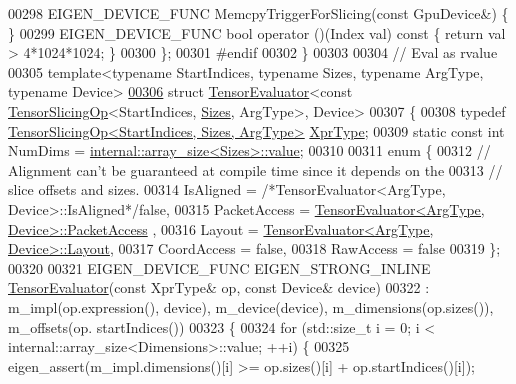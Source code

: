 \begin{DoxyCode}
00298   EIGEN\_DEVICE\_FUNC MemcpyTriggerForSlicing(\textcolor{keyword}{const} GpuDevice&) \{ \}
00299   EIGEN\_DEVICE\_FUNC \textcolor{keywordtype}{bool} operator ()(Index val)\textcolor{keyword}{ const }\{ \textcolor{keywordflow}{return} val > 4*1024*1024; \}
00300 \};
00301 \textcolor{preprocessor}{#endif}
00302 \}
00303 
00304 \textcolor{comment}{// Eval as rvalue}
00305 \textcolor{keyword}{template}<\textcolor{keyword}{typename} StartIndices, \textcolor{keyword}{typename} Sizes, \textcolor{keyword}{typename} ArgType, \textcolor{keyword}{typename} Device>
\hyperlink{struct_eigen_1_1_tensor_evaluator_3_01const_01_tensor_slicing_op_3_01_start_indices_00_01_sizes_ad061dd92ee73f8ad7fd3bb05ad7286d}{00306} \textcolor{keyword}{struct }\hyperlink{struct_eigen_1_1_tensor_evaluator}{TensorEvaluator}<const \hyperlink{class_eigen_1_1_tensor_slicing_op}{TensorSlicingOp}<StartIndices, 
      \hyperlink{struct_eigen_1_1_sizes}{Sizes}, ArgType>, Device>
00307 \{
00308   \textcolor{keyword}{typedef} \hyperlink{class_eigen_1_1_tensor_slicing_op}{TensorSlicingOp<StartIndices, Sizes, ArgType>} 
      \hyperlink{class_eigen_1_1_tensor_slicing_op}{XprType};
00309   \textcolor{keyword}{static} \textcolor{keyword}{const} \textcolor{keywordtype}{int} NumDims = \hyperlink{struct_eigen_1_1internal_1_1array__size}{internal::array\_size<Sizes>::value};
00310 
00311   \textcolor{keyword}{enum} \{
00312     \textcolor{comment}{// Alignment can't be guaranteed at compile time since it depends on the}
00313     \textcolor{comment}{// slice offsets and sizes.}
00314     IsAligned = \textcolor{comment}{/*TensorEvaluator<ArgType, Device>::IsAligned*/}\textcolor{keyword}{false},
00315     PacketAccess = \hyperlink{struct_eigen_1_1_tensor_evaluator}{TensorEvaluator<ArgType, Device>::PacketAccess}
      ,
00316     Layout = \hyperlink{struct_eigen_1_1_tensor_evaluator}{TensorEvaluator<ArgType, Device>::Layout},
00317     CoordAccess = \textcolor{keyword}{false},
00318     RawAccess = \textcolor{keyword}{false}
00319   \};
00320 
00321   EIGEN\_DEVICE\_FUNC EIGEN\_STRONG\_INLINE \hyperlink{struct_eigen_1_1_tensor_evaluator}{TensorEvaluator}(\textcolor{keyword}{const} XprType& op, \textcolor{keyword}{const} Device& 
      device)
00322       : m\_impl(op.expression(), device), m\_device(device), m\_dimensions(op.sizes()), m\_offsets(op.
      startIndices())
00323   \{
00324     \textcolor{keywordflow}{for} (std::size\_t i = 0; i < internal::array\_size<Dimensions>::value; ++i) \{
00325       eigen\_assert(m\_impl.dimensions()[i] >= op.sizes()[i] + op.startIndices()[i]);

\end{DoxyCode}
